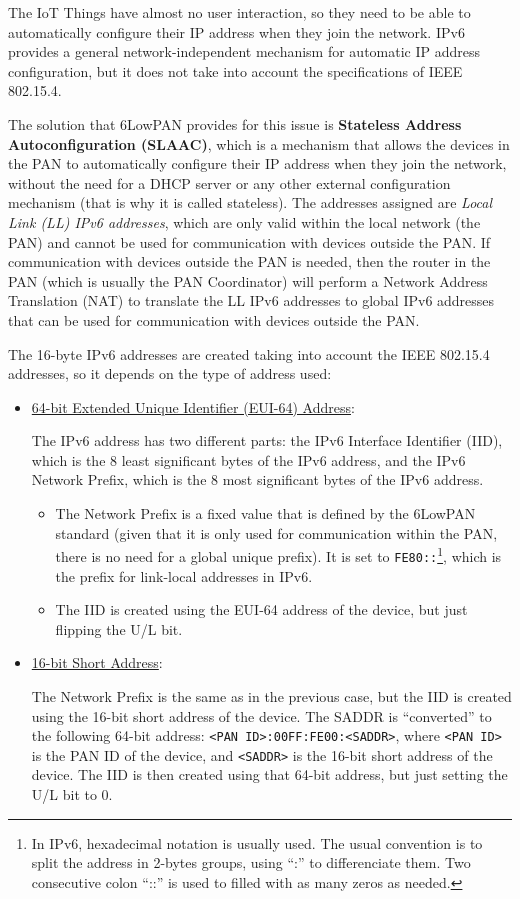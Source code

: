 The IoT Things have almost no user interaction, so they need to be able to automatically configure their IP address when they join the network. IPv6 provides a general network-independent mechanism for automatic IP address configuration, but it does not take into account the specifications of IEEE 802.15.4.

The solution that 6LowPAN provides for this issue is \textbf{Stateless Address Autoconfiguration (SLAAC)}, which is a mechanism that allows the devices in the PAN to automatically configure their IP address when they join the network, without the need for a DHCP server or any other external configuration mechanism (that is why it is called stateless). The addresses assigned are \emph{Local Link (LL) IPv6 addresses}, which are only valid within the local network (the PAN) and cannot be used for communication with devices outside the PAN. If communication with devices outside the PAN is needed, then the router in the PAN (which is usually the PAN Coordinator) will perform a Network Address Translation (NAT) to translate the LL IPv6 addresses to global IPv6 addresses that can be used for communication with devices outside the PAN.

The 16-byte IPv6 addresses are created taking into account the IEEE 802.15.4 addresses, so it depends on the type of address used:
\begin{itemize}
    \item \ul{64-bit Extended Unique Identifier (EUI-64) Address}:
    
    The IPv6 address has two different parts: the IPv6 Interface Identifier (IID), which is the 8 least significant bytes of the IPv6 address, and the IPv6 Network Prefix, which is the 8 most significant bytes of the IPv6 address.
    \begin{itemize}
        \item The Network Prefix is a fixed value that is defined by the 6LowPAN standard (given that it is only used for communication within the PAN, there is no need for a global unique prefix). It is set to \texttt{FE80::}\footnote{In IPv6, hexadecimal notation is usually used. The usual convention is to split the address in 2-bytes groups, using ``:'' to differenciate them. Two consecutive colon ``::'' is used to filled with as many zeros as needed.}, which is the prefix for link-local addresses in IPv6.
        
        \item The IID is created using the EUI-64 address of the device, but just flipping the U/L bit.
    \end{itemize}
    \item \ul{16-bit Short Address}:
    
    The Network Prefix is the same as in the previous case, but the IID is created using the 16-bit short address of the device. The SADDR is ``converted'' to the following 64-bit address: \texttt{<PAN ID>:00FF:FE00:<SADDR>}, where \texttt{<PAN ID>} is the PAN ID of the device, and \texttt{<SADDR>} is the 16-bit short address of the device. The IID is then created using that 64-bit address, but just setting the U/L bit to 0.
\end{itemize}

